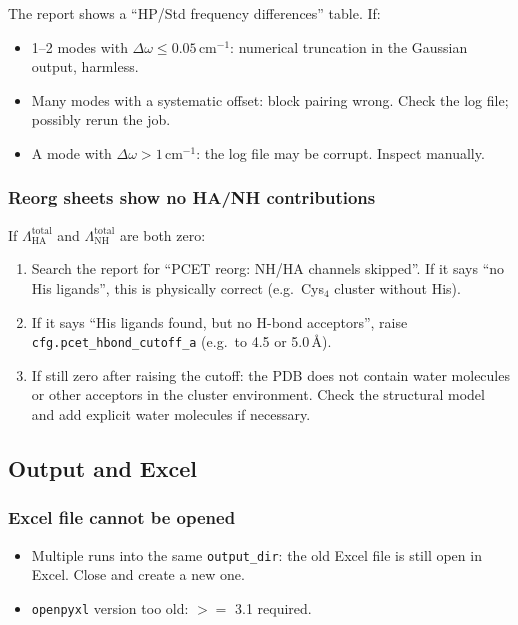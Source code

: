 \documentclass[11pt,a4paper,twoside]{article}
\theoremstyle{remark}
\begin{document}
The report shows a ``HP/Std frequency differences'' table. If:

\begin{itemize}
  \item 1--2 modes with $\Delta\omega \leq 0.05$\,cm$^{-1}$:
        numerical truncation in the Gaussian output, harmless.
  \item Many modes with a systematic offset: block pairing wrong.
        Check the log file; possibly rerun the job.
  \item A mode with $\Delta\omega > 1$\,cm$^{-1}$: the log file
        may be corrupt. Inspect manually.
\end{itemize}

\subsubsection*{Reorg sheets show no HA/NH contributions}

If $\Lambda_\text{HA}^\text{total}$ and
$\Lambda_\text{NH}^\text{total}$ are both zero:

\begin{enumerate}
  \item Search the report for ``PCET reorg: NH/HA channels
        skipped''. If it says ``no His ligands'', this is
        physically correct (e.g.\ Cys$_4$ cluster without His).
  \item If it says ``His ligands found, but no H-bond acceptors'',
        raise \texttt{cfg.pcet\_hbond\_cutoff\_a} (e.g.\ to 4.5
        or 5.0\,\AA{}).
  \item If still zero after raising the cutoff: the PDB does not
        contain water molecules or other acceptors in the cluster
        environment. Check the structural model and add explicit
        water molecules if necessary.
\end{enumerate}

\subsection{Output and Excel}

\subsubsection*{Excel file cannot be opened}

\begin{itemize}
  \item Multiple runs into the same \texttt{output\_dir}: the old
        Excel file is still open in Excel. Close and create a new
        one.
  \item \texttt{openpyxl} version too old: $>=$ 3.1 required.
\end{itemize}
\end{document}
